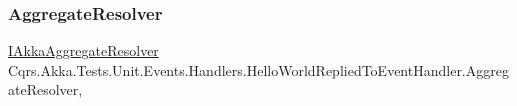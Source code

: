 \subsubsection{\texorpdfstring{Aggregate\+Resolver}{AggregateResolver}}
{\footnotesize\ttfamily \hyperlink{interfaceCqrs_1_1Akka_1_1Domain_1_1IAkkaAggregateResolver}{I\+Akka\+Aggregate\+Resolver} Cqrs.\+Akka.\+Tests.\+Unit.\+Events.\+Handlers.\+Hello\+World\+Replied\+To\+Event\+Handler.\+Aggregate\+Resolver\hspace{0.3cm}{\ttfamily [get]}, {\ttfamily [protected]}}

